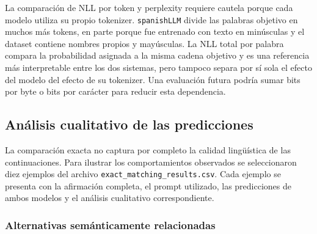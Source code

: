 \documentclass[11pt,a4paper]{article}
\newcommand{\spanishmodel}{\texttt{spanishLLM}}
\newcommand{\code}[1]{\texttt{#1}}
\begin{document}
La comparación de NLL por token y perplexity requiere cautela porque cada
modelo utiliza su propio tokenizer. \spanishmodel{} divide las palabras
objetivo en muchos más tokens, en parte porque fue entrenado con texto en
minúsculas y el dataset contiene nombres propios y mayúsculas. La NLL total por
palabra compara la probabilidad asignada a la misma cadena objetivo y es una
referencia más interpretable entre los dos sistemas, pero tampoco separa por sí
sola el efecto del modelo del efecto de su tokenizer. Una evaluación futura
podría sumar bits por byte o bits por carácter para reducir esta dependencia.


\subsection{Análisis cualitativo de las predicciones}

La comparación exacta no captura por completo la calidad lingüística de las
continuaciones. Para ilustrar los comportamientos observados se seleccionaron
diez ejemplos del archivo \code{exact\_matching\_results.csv}. Cada ejemplo se
presenta con la afirmación completa, el prompt utilizado, las predicciones de
ambos modelos y el análisis cualitativo correspondiente.

\subsubsection{Alternativas semánticamente relacionadas}
\end{document}
